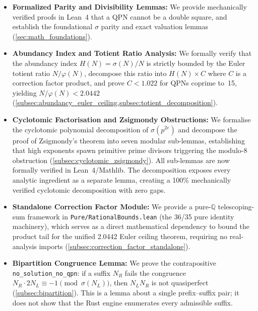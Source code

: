 \begin{itemize}
  \item \textbf{Formalized Parity and Divisibility Lemmas:}
    We provide mechanically verified proofs in Lean~4 that a QPN cannot
    be a double square, and establish the foundational $\sigma$ parity
    and exact valuation lemmas (\cref{sec:math_foundations}).

  \item \textbf{Abundancy Index and Totient Ratio Analysis:}
    We formally verify that the abundancy index
    $H(N) = \sigma(N)/N$ is strictly bounded by the Euler totient ratio
    $N/\varphi(N)$, decompose this ratio into $H(N) \times C$ where $C$
    is a correction factor product, and prove $C < 1.022$ for QPNs
    coprime to~15, yielding $N/\varphi(N) < 2.0442$
    (\cref{subsec:abundancy_euler_ceiling,subsec:totient_decomposition}).

  \item \textbf{Cyclotomic Factorisation and Zsigmondy Obstructions:}
    We formalise the cyclotomic polynomial decomposition of
    $\sigma(p^{2e})$ and decompose the proof of Zsigmondy's theorem
    into seven modular sub-lemmas, establishing
    that high exponents spawn primitive prime divisors triggering the
    modulo-8 obstruction (\cref{subsec:cyclotomic_zsigmondy}).
    All sub-lemmas are now formally verified in Lean~4/Mathlib.
    The decomposition exposes every analytic ingredient
    as a separate lemma, creating a 100\% mechanically verified
    cyclotomic decomposition with zero gaps.

  \item \textbf{Standalone Correction Factor Module:}
    We provide a pure-$\mathbb{Q}$ telescoping-sum framework in
    \texttt{Pure/RationalBounds.lean} (the 36/35 pure identity machinery), 
    which serves as a direct mathematical dependency to bound the product 
    tail for the unified 2.0442 Euler ceiling theorem, requiring no real-analysis imports
    (\cref{subsec:correction_factor_standalone}).

  \item \textbf{Bipartition Congruence Lemma:}
    We prove the contrapositive
    \texttt{no\_\allowbreak{}solution\_\allowbreak{}no\_\allowbreak{}qpn}:
    if a suffix $N_R$ fails the congruence
    $N_R \cdot 2N_L \equiv -1 \pmod{\sigma(N_L)}$, then
    $N_L N_R$ is not quasiperfect (\cref{subsec:bipartition}).  This is
    a lemma about a single prefix--suffix pair; it does not show that
    the Rust engine enumerates every admissible suffix.


\end{itemize}
